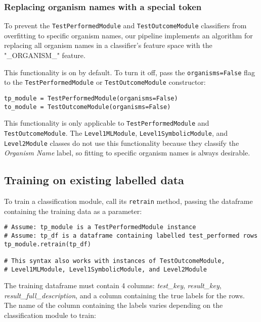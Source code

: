 \documentclass[a4paper]{article}
\begin{document}
\subsubsection{Replacing organism names with a special token} \label{replacing_organism_names_with_a_special_token}

To prevent the \lstinline{TestPerformedModule} and \lstinline{TestOutcomeModule} classifiers from overfitting to specific organism names, our pipeline implements an algorithm for replacing all organism names in a classifier's feature space with the "\_ORGANISM\_" feature.

This functionality is on by default. To turn it off, pass the \lstinline{organisms=False} flag to the \lstinline{TestPerformedModule} or \lstinline{TestOutcomeModule} constructor:

\lstset{language=Python}
\begin{lstlisting}
tp_module = TestPerformedModule(organisms=False)
to_module = TestOutcomeModule(organisms=False)
\end{lstlisting}
\lstset{language=}

This functionality is only applicable to \lstinline{TestPerformedModule} and \lstinline{TestOutcomeModule}. The \lstinline{Level1MLModule}, \lstinline{Level1SymbolicModule}, and \lstinline{Level2Module} classes do not use this functionality because they classify the \textit{Organism Name} label, so fitting to specific organism names is always desirable.

\subsection{Training on existing labelled data}

To train a classification module, call its \lstinline{retrain} method, passing the dataframe containing the training data as a parameter:

\lstset{language=Python}
\begin{lstlisting}
# Assume: tp_module is a TestPerformedModule instance
# Assume: tp_df is a dataframe containing labelled test_performed rows
tp_module.retrain(tp_df)

# This syntax also works with instances of TestOutcomeModule,
# Level1MLModule, Level1SymbolicModule, and Level2Module
\end{lstlisting}
\lstset{language=}

The training dataframe must contain 4 columns: \textit{test\_key}, \textit{result\_key}, \textit{result\_full\_description}, and a column containing the true labels for the rows. The name of the column containing the labels varies depending on the classification module to train:
\end{document}
